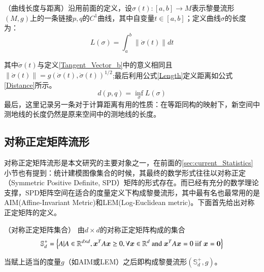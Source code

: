 \begin{definition}
{\heiti（曲线长度与距离）}沿用前面的定义，设$\sigma(t):[a,b]\rightarrow  M$表示黎曼流形$(M,g)$上的一条链接$p,q$的$C^{1}$曲线，其中自变量$t \in [a,b]$；定义曲线$\sigma$的长度为：
\begin{equation}
\label{Length}
L(\sigma)=\int_{a}^{b}{\|\dot{\sigma}(t)\|}dt
\end{equation}
\end{definition}
其中$\dot{\sigma}(t)$与定义\ref{Tangent_Vector_b}中的意义相同且$\|\dot{\sigma}(t)\|=g(\dot{\sigma}(t),\dot{\sigma}(t))^{1/2}$;最后利用公式\ref{Length}定义距离如公式\ref{Distance}所示。
\begin{equation}
\label{Distance}
d(p,q)=\inf_{\sigma}L(\sigma)
\end{equation}
最后，这里记录另一条对于计算距离有用的性质：在等距同构的映射下，新空间中测地线的长度仍然是原来空间中的测地线的长度。
\subsection{对称正定矩阵流形}
\label{sec:Manifold_SPD}
对称正定矩阵流形是本文研究的主要对象之一，在前面的\ref{sec:current_Statistics}小节也有提到：统计建模图像集合的时候，其最终的数学形式往往以对称正定（Symmetric Positive Definite, SPD）矩阵的形式存在。而已经有充分的数学理论支撑，SPD矩阵空间在适合的度量定义下构成黎曼流形，其中最有名也最常用的是AIM(Affine-Invariant Metric\cite{AIM_metric})和LEM(Log-Euclidean metric\cite{LEM_metric})。下面首先给出对称正定矩阵的定义。
\begin{definition}
{\heiti（对称正定矩阵集合）} 由$d \times d$的对称正定矩阵构成的集合
\begin{equation}
\label{SPD_Matrices}
\mathbb{S}_{d}^{+}=\left\{A|A \in \mathbb{R}^{d\times d},\bm{x}^{T}A\bm{x} \geq 0,\forall \bm{x} \in \mathbb{R}^{d}~{\rm and}~\bm{x}^{T}A\bm{x}=0~{\rm iif}~\bm{x}=\bm{0}\right\}
\end{equation}
\end{definition}
当赋上适当的度量$g$（如AIM\cite{AIM_metric}或LEM\cite{LEM_metric}）之后即构成黎曼流形$(\mathbb{S}_{d}^{+},g)$。

